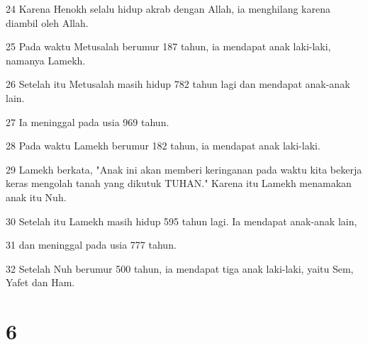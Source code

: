 \par 24 Karena Henokh selalu hidup akrab dengan Allah, ia menghilang karena diambil oleh Allah.
\par 25 Pada waktu Metusalah berumur 187 tahun, ia mendapat anak laki-laki, namanya Lamekh.
\par 26 Setelah itu Metusalah masih hidup 782 tahun lagi dan mendapat anak-anak lain.
\par 27 Ia meninggal pada usia 969 tahun.
\par 28 Pada waktu Lamekh berumur 182 tahun, ia mendapat anak laki-laki.
\par 29 Lamekh berkata, "Anak ini akan memberi keringanan pada waktu kita bekerja keras mengolah tanah yang dikutuk TUHAN." Karena itu Lamekh menamakan anak itu Nuh.
\par 30 Setelah itu Lamekh masih hidup 595 tahun lagi. Ia mendapat anak-anak lain,
\par 31 dan meninggal pada usia 777 tahun.
\par 32 Setelah Nuh berumur 500 tahun, ia mendapat tiga anak laki-laki, yaitu Sem, Yafet dan Ham.

\chapter{6}

